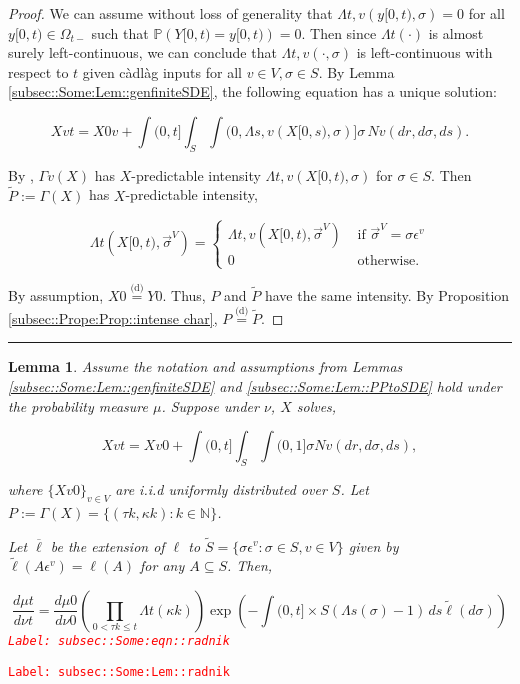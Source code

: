\documentclass[12pt]{article}
\newcommand{\mb}{\mathbb}
\newcommand{\ov}{\overline}
\newcommand{\te}{\text}
\newcommand{\ep}{\epsilon}
\newcommand{\tr}{\textcolor{red}}
\newcommand{\labe}[1]{\tr{\texttt{Label: #1}}}
\newcommand{\ind}{\hspace{24pt}}
\newcommand{\lin}{\rule{\linewidth}{0.4 pt}}
\newcommand{\pr}{\mb{P}}							%
\newcommand{\deq}{\overset{\text{(d)}}{=}}			%
\newcommand{\defeq}{:=}								%
\renewcommand{\v}{v}							%
\renewcommand{\S}{S}							%
\newcommand{\s}{\sigma}							%
\newcommand{\sv}{\vec{\s}}						%
\newcommand{\ev}{\ep}							%
\renewcommand{\t}{t}							%
\newcommand{\sset}{\Omega}						%
\renewcommand{\tt}{s}							%
\newcommand{\X}{X}								%
\newcommand{\vind}[1]{^{#1}}					%
\newcommand{\vsi}[1]{^{#1}}						%
\newcommand{\cind}[1]{_{#1}}					%
\newcommand{\ts}[1]{_{#1}}						%
\newcommand{\poiss}{N}							%
\newcommand{\Sm}{\ell}							%
\renewcommand{\r}{r}							%
\newcommand{\alt}[1]{\widetilde{#1}}			%
\newcommand{\m}{\mu}							%
\newcommand{\mm}{\nu}							%
\newcommand{\XX}{Y}								%
\newcommand{\rt}{\tau}							%
\renewcommand{\it}{k}							%
\newcommand{\pmap}{\Gamma}						%
\renewcommand{\mark}{\kappa}					%
\newcommand{\rp}{P}								%
\newcommand{\typset}{A}							%
\newcommand{\ratee}{\Lambda}					%
\newcommand{\xx}{y}								%
\newtheorem{lem}[thms]{Lemma}
\begin{document}
\begin{proof}

We can assume without loss of generality that \(\ratee{\t,\v}(\xx{}{[0,\t)},\s) = 0\) for all \(\xx{}{[0,\t)}\in \sset\vsi{}\ts{\t-}\) such that \(\pr(\XX{}{[0,\t)} = \xx{}{[0,\t)}) = 0\). Then since \(\ratee{\t}(\cdot)\) is almost surely left-continuous, we can conclude that \(\ratee{\t,\v}(\cdot,\s)\) is left-continuous with respect to \(\t\) given c\`adl\`ag inputs for all \(\v\in V,\s\in\S\). By Lemma \ref{subsec::Some:Lem::genfiniteSDE}, the following equation has a unique solution:

\[\X{\v}{\t} = \X{0}{\v} + \int{(0,\t]}\int_\S\int{(0,\ratee{\tt,\v}(\X{}{[0,\tt)},\s)]}  \s\,\poiss{\v}(d\r,d\s,d\tt).\]

By \cite[Exercise 14.7.1]{DalVer08}, \(\pmap{\v}(\X{}{})\) has \(\X{}{}\)-predictable intensity \(\ratee{\t,\v}(\X{}{[0,\t)},\s)\) for \(\s \in \S\). Then \(\alt{\rp{}} \defeq \pmap{}(\X{}{})\) has \(\X{}{}\)-predictable intensity,

\[\ratee{\t}(\X{}{[0,\t)},\sv\cind{}\vsi{V}) = \begin{cases}
\ratee{\t,\v}(\X{}{[0,\t)},\sv\cind{}\vsi{V}) &\te{ if } \sv\cind{}\vsi{V} = \s\ev\vind{\v}\\
0&\te{ otherwise.}
\end{cases}\]

By assumption, \(\X{}{0} \deq \XX{}{0}\). Thus, \(\rp{}\) and \(\alt{\rp{}}\) have the same intensity. By Proposition \ref{subsec::Prope:Prop::intense char}, \(\rp{} \deq \alt{\rp{}}\).
\end{proof}
\lin

\begin{lem}
Assume the notation and assumptions from Lemmas \ref{subsec::Some:Lem::genfiniteSDE} and \ref{subsec::Some:Lem::PPtoSDE} hold under the probability measure \(\m{}{}{}\). Suppose under \(\mm{}{}{}\), \(\X{}{}\) solves,

\[\X{\v}{\t} = \X{\v}{0} +\int{(0,\t]}\int_\S\int{(0,1]} \s \poiss{\v}(d\r,d\s,d\tt),\]

where \(\{\X{\v}{0}\}_{\v \in V}\) are i.i.d uniformly distributed over \(\S\). Let \(\rp{} \defeq \pmap{}(\X{}{}) = \{(\rt{\it},\mark{\it}):\it\in \mb{N}\}\).

\ind Let \(\ov{\ell}\) be the extension of \(\Sm\) to \(\alt{\S} = \{\s\ev\vind{\v}: \s \in \S, \v \in V\}\) given by \(\alt{\Sm}(\typset\ev\vind{\v}) = \Sm(\typset)\) for any \(\typset \subseteq \S\). Then,

\begin{equation}
\frac{d\m{}{\t}{}}{d\mm{}{\t}{}}= \frac{d\m{}{0}{}}{d\mm{}{0}{}}\left(\prod_{0< \rt{\it}\leq \t} \ratee{\t}(\mark{\it})\right)\exp\left(-\int{(0,\t]\times \S} (\ratee{\tt}(\s) - 1)\,d\tt\alt{\Sm}(d\s)\right)
\label{subsec::Some:eqn::radnik}
\end{equation}
\labe{subsec::Some:eqn::radnik}
\label{subsec::Some:Lem::radnik}
\end{lem}
\labe{subsec::Some:Lem::radnik}
\end{document}
